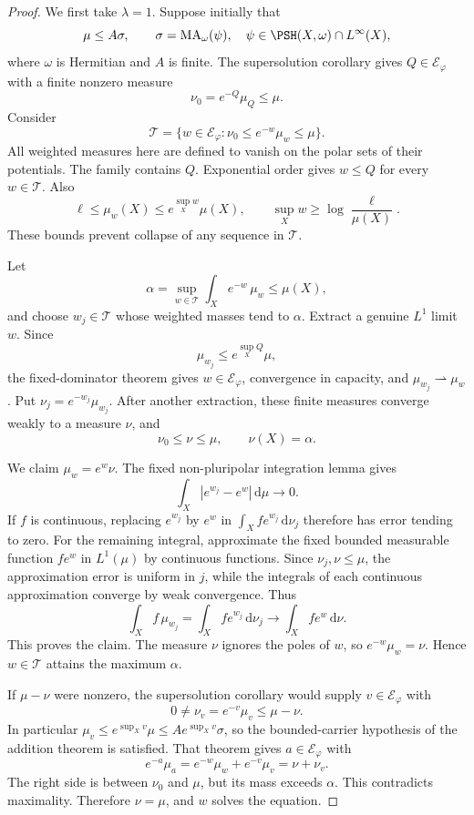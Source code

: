 \begin{proof}
We first take $\lambda=1$. Suppose initially that
\[
 \mu\leq A\sigma,\qquad
 \sigma=\mathrm{MA}_\omega(\psi),\quad
 \psi\in\PSH(X,\omega)\cap L^\infty(X),
\]
where $\omega$ is Hermitian and $A$ is finite. The supersolution corollary gives $Q\in\mathcal E_\varphi$ with a finite nonzero measure
\[
 \nu_0=e^{-Q}\mu_Q\leq\mu.
\]
Consider
\[
 \mathcal T=\{w\in\mathcal E_\varphi:
              \nu_0\leq e^{-w}\mu_w\leq\mu\}.
\]
All weighted measures here are defined to vanish on the polar sets of their potentials. The family contains $Q$. Exponential order gives $w\leq Q$ for every $w\in\mathcal T$. Also
\[
 \ell\leq\mu_w(X)\leq e^{\sup_Xw}\mu(X),
 \qquad
 \sup_Xw\geq\log\frac{\ell}{\mu(X)}.
\]
These bounds prevent collapse of any sequence in $\mathcal T$.

Let
\[
 \alpha=\sup_{w\in\mathcal T}\int_Xe^{-w}\,\mu_w\leq\mu(X),
\]
and choose $w_j\in\mathcal T$ whose weighted masses tend to $\alpha$. Extract a genuine $L^1$ limit $w$. Since
\[
 \mu_{w_j}\leq e^{\sup_XQ}\mu,
\]
the fixed-dominator theorem gives $w\in\mathcal E_\varphi$, convergence in capacity, and $\mu_{w_j}\rightharpoonup\mu_w$. Put $\nu_j=e^{-w_j}\mu_{w_j}$. After another extraction, these finite measures converge weakly to a measure $\nu$, and
\[
 \nu_0\leq\nu\leq\mu,\qquad \nu(X)=\alpha.
\]

We claim $\mu_w=e^w\nu$. The fixed non-pluripolar integration lemma gives
\[
 \int_X|e^{w_j}-e^w|\,\mathrm{d}\mu\longrightarrow0.
\]
If $f$ is continuous, replacing $e^{w_j}$ by $e^w$ in $\int_Xf e^{w_j}\,\mathrm{d}\nu_j$ therefore has error tending to zero. For the remaining integral, approximate the fixed bounded measurable function $f e^w$ in $L^1(\mu)$ by continuous functions. Since $\nu_j,\nu\leq\mu$, the approximation error is uniform in $j$, while the integrals of each continuous approximation converge by weak convergence. Thus
\[
 \int_Xf\,\mu_{w_j}
 =\int_Xf e^{w_j}\,\mathrm{d}\nu_j
 \longrightarrow\int_Xf e^w\,\mathrm{d}\nu.
\]
This proves the claim. The measure $\nu$ ignores the poles of $w$, so $e^{-w}\mu_w=\nu$. Hence $w\in\mathcal T$ attains the maximum $\alpha$.

If $\mu-\nu$ were nonzero, the supersolution corollary would supply $v\in\mathcal E_\varphi$ with
\[
 0\ne\nu_v=e^{-v}\mu_v\leq\mu-\nu.
\]
In particular $\mu_v\leq e^{\sup_Xv}\mu\leq A e^{\sup_Xv}\sigma$, so the bounded-carrier hypothesis of the addition theorem is satisfied. That theorem gives $a\in\mathcal E_\varphi$ with
\[
 e^{-a}\mu_a=e^{-w}\mu_w+e^{-v}\mu_v=\nu+\nu_v.
\]
The right side is between $\nu_0$ and $\mu$, but its mass exceeds $\alpha$. This contradicts maximality. Therefore $\nu=\mu$, and $w$ solves the equation.


\end{proof}
